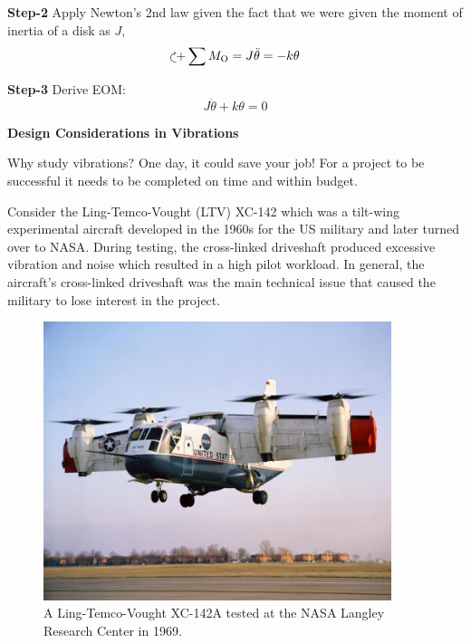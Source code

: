 \documentclass[12pt,letter]{article}
\begin{document}
\begin{example}
			\noindent \textbf{Step-2} Apply Newton's 2nd law given the fact that we were given the moment of inertia of a disk as $J$,
			\begin{equation}
				\curveplusclock \sum M_\text{O} = J \ddot{\theta} =  -k \theta
			\end{equation}
			
			\noindent \textbf{Step-3} Derive EOM:
			\begin{equation}
				J \ddot{\theta} + k\theta  =0
			\end{equation}	
		\end{example}		

		\begin{vibration_case_study}
			
			\textbf{Design Considerations in Vibrations}

			\noindent Why study vibrations? One day, it could save your job! For a project to be successful it needs to be completed on time and within budget. 
			
			Consider the Ling-Temco-Vought (LTV) XC-142  which was a tilt-wing experimental aircraft developed in the 1960s for the US military and later turned over to NASA. During testing, the cross-linked driveshaft produced excessive vibration and noise which resulted in a high pilot workload. In general, the aircraft's cross-linked driveshaft was the main technical issue that caused the military to lose interest in the project. 
			
			\begin{figure}[H]
				\centering
				\includegraphics[width=4in]{../figures/Ling_Temco_Vought_XC_142A.jpg}
				\caption{A Ling-Temco-Vought XC-142A tested at the NASA Langley Research Center in 1969. \protect\footnotemark[1]}
			\end{figure}
		\end{vibration_case_study}




	
\end{document}
